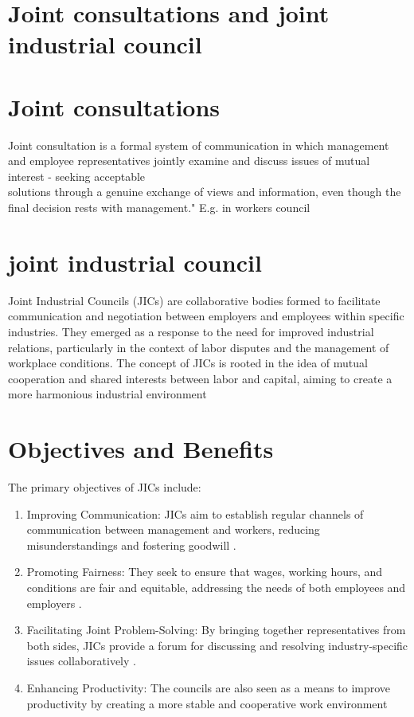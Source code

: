 \documentclass[10pt]{article}
\begin{document}
\section*{Joint consultations and joint industrial council}
\section*{Joint consultations}
Joint consultation is a formal system of communication in which management and employee representatives jointly examine and discuss issues of mutual interest - seeking acceptable\\
solutions through a genuine exchange of views and information, even though the final decision rests with management." E.g. in workers council

\section*{joint industrial council}
Joint Industrial Councils (JICs) are collaborative bodies formed to facilitate communication and negotiation between employers and employees within specific industries. They emerged as a response to the need for improved industrial relations, particularly in the context of labor disputes and the management of workplace conditions. The concept of JICs is rooted in the idea of mutual cooperation and shared interests between labor and capital, aiming to create a more harmonious industrial environment

\section*{Objectives and Benefits}
The primary objectives of JICs include:

\begin{enumerate}
  \item Improving Communication: JICs aim to establish regular channels of communication between management and workers, reducing misunderstandings and fostering goodwill .
  \item Promoting Fairness: They seek to ensure that wages, working hours, and conditions are fair and equitable, addressing the needs of both employees and employers .
  \item Facilitating Joint Problem-Solving: By bringing together representatives from both sides, JICs provide a forum for discussing and resolving industry-specific issues collaboratively .
  \item Enhancing Productivity: The councils are also seen as a means to improve productivity by creating a more stable and cooperative work environment
\end{enumerate}
\end{document}
